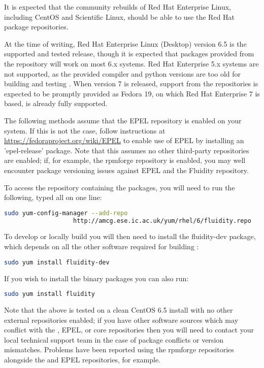 It is expected that the community rebuilds of Red Hat Enterprise Linux,
including CentOS and Scientific Linux, should be able to use the \fluidity Red
Hat package repositories.

At the time of writing, Red Hat Enterprise Linux (Desktop) version 6.5 is the
supported and tested release, though it is expected that packages provided from
the \fluidity repository will work on most 6.x systems. Red Hat Enterprise 5.x
systems are not supported, as the provided compiler and python versions are too
old for building and testing \fluidity. When version 7 is released, support from
the \fluidity repositories is expected to be promptly provided as Fedora 19, on
which Red Hat Enterprise 7 is based, is already fully supported.

The following methods assume that the EPEL repository is enabled on your
system. If this is not the case, follow instructions at
\url{https://fedoraproject.org/wiki/EPEL} to enable use of EPEL by installing
an 'epel-release' package. Note that this assumes no other third-party
repositories are enabled; if, for example, the rpmforge repository is enabled,
you may well encounter package versioning issues against EPEL and the Fluidity
repository.

To access the repository containing the \fluidity packages, you will
need to run the following, typed all on one line:

\begin{lstlisting}[language=bash]
sudo yum-config-manager --add-repo
                   http://amcg.ese.ic.ac.uk/yum/rhel/6/fluidity.repo
\end{lstlisting}

To develop or locally build \fluidity you will then need to install the
fluidity-dev package, which depends on all the other software required for
building \fluidity:

\begin{lstlisting}[language=bash]
sudo yum install fluidity-dev
\end{lstlisting}

If you wish to install the \fluidity binary packages you can also run:

\begin{lstlisting}[language=bash]
sudo yum install fluidity
\end{lstlisting}

Note that the above is tested on a clean CentOS 6.5 install with no other
external repositories enabled; if you have other software sources which may
conflict with the \fluidity, EPEL, or core repositories then you will need to
contact your local technical support team in the case of package conflicts or
version mismatches. Problems have been reported using the rpmforge repositories
alongside the \fluidity and EPEL repositories, for example.

